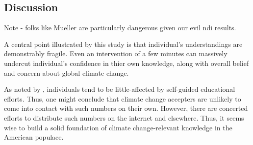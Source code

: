 \subsection{Discussion}
Note - folks like Mueller are particularly dangerous given our evil ndi results.

A central point illustrated by this study is that individual's understandings
are demonstrably fragile. Even an intervention of a few minutes can massively
undercut individual's confidence in thier own knowledge, along with overall
belief and concern about global climate change.

As noted by \textcite{kahan,mccright}, individuals tend to be little-affected by
self-guided educational efforts. Thus, one might conclude that climate change
accepters are unlikely to come into contact with such numbers on their own.
However, there are concerted efforts to distribute such numbers on the internet
and elsewhere. Thus, it seems wise to build a solid foundation of climate
change-relevant knowledge in the American populace. 
